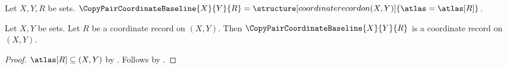 

\begin{definition}\label{copy_pair_coordinate_definition}
    Let $X,Y,R$ be sets.
    $\CopyPairCoordinateBaseline{X}{Y}{R}=
        \structure[coordinate record on (X,Y)]{\atlas=\atlas[R]}$.
\end{definition}

\begin{classification}\label{copy_pair_coordinate_classification}
    Let $X,Y$ be sets.
    Let $R$ be a coordinate record on $(X,Y)$.
    Then $\CopyPairCoordinateBaseline{X}{Y}{R}$ is a coordinate record on $(X,Y)$.
\end{classification}
\begin{proof}
    $\atlas[R]\subseteq (X,Y)$ by .
    Follows by .
\end{proof}
